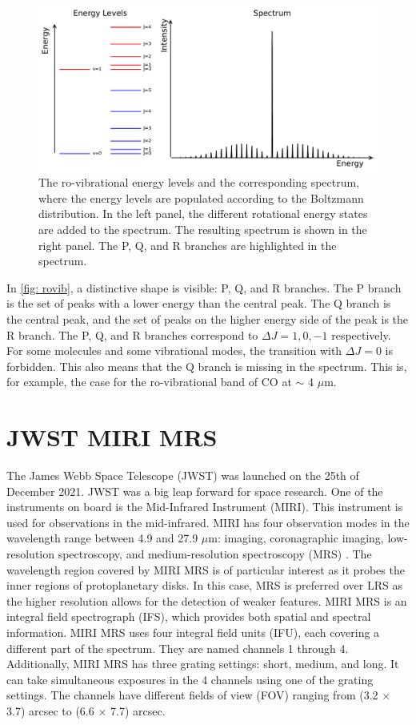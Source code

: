 \documentclass[oneside, single, authoryear, semicolon, 12pt]{lion-msc}
\newcommand{\4}{$_4$}
\newcommand{\3}{$_3$}
\newcommand{\2}{$_2$}
\begin{document}
\begin{figure}[H]
    \centering
    \includegraphics[width=\linewidth]{Figures/RoVibSpectrum.pdf}
    \caption{The ro-vibrational energy levels and the corresponding spectrum, where the energy levels are populated according to the Boltzmann distribution. In the left panel, the different rotational energy states are added to the spectrum. The resulting spectrum is shown in the right panel. The P, Q, and R branches are highlighted in the spectrum. }
    \label{fig: rovib}
\end{figure}

In \autoref{fig: rovib}, a distinctive shape is visible: P, Q, and R branches. The P branch is the set of peaks with a lower energy than the central peak. The Q branch is the central peak, and the set of peaks on the higher energy side of the peak is the R branch. The P, Q, and R branches correspond to $\Delta J=1, 0, -1$ respectively. For some molecules and some vibrational modes, the transition with $\Delta J=0$ is forbidden. This also means that the Q branch is missing in the spectrum. This is, for example, the case for the ro-vibrational band of CO at $\sim$ 4 $\mu$m.

\section{JWST MIRI MRS}
The James Webb Space Telescope (JWST) was launched on the 25th of December 2021. JWST was a big leap forward for space research. One of the instruments on board is the Mid-Infrared Instrument (MIRI). This instrument is used for observations in the mid-infrared. MIRI has four observation modes in the wavelength range between 4.9 and 27.9 $\mu$m:  imaging, coronagraphic imaging, low-resolution spectroscopy, and medium-resolution spectroscopy (MRS) \citep{}. 
The wavelength region covered by MIRI MRS is of particular interest as it probes the inner regions of protoplanetary disks. In this case, MRS is preferred over LRS as the higher resolution allows for the detection of weaker features. MIRI MRS is an integral field spectrograph (IFS), which provides both spatial and spectral information. MIRI MRS uses four integral field units (IFU), each covering a different part of the spectrum. They are named channels 1 through 4. Additionally, MIRI MRS has three grating settings: short, medium, and long. It can take simultaneous exposures in the 4 channels using one of the grating settings. The channels have different fields of view (FOV) ranging from (3.2 $\times$ 3.7) arcsec to (6.6 $\times$ 7.7) arcsec. 
\end{document}

